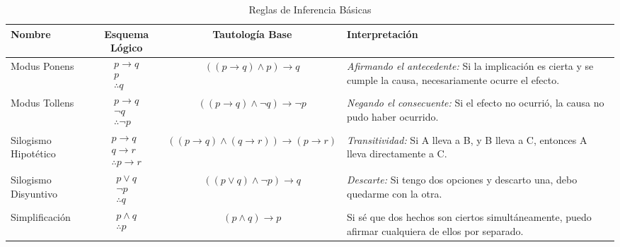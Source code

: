 \begin{table}[h]
\centering
\small
\renewcommand{\arraystretch}{1.5} %
\begin{tabularx}{\textwidth}{|l|c|c|X|}
\hline
\textbf{Nombre} & \textbf{Esquema Lógico} & \textbf{Tautología Base} & \textbf{Interpretación} \\ \hline
Modus Ponens & $\begin{array}{c} p \to q \\ p \\ \hline \therefore q \end{array}$ & $((p \to q) \land p) \to q$ & \textit{Afirmando el antecedente:} Si la implicación es cierta y se cumple la causa, necesariamente ocurre el efecto. \\ \hline
Modus Tollens & $\begin{array}{c} p \to q \\ \neg q \\ \hline \therefore \neg p \end{array}$ & $((p \to q) \land \neg q) \to \neg p$ & \textit{Negando el consecuente:} Si el efecto no ocurrió, la causa no pudo haber ocurrido. \\ \hline
Silogismo Hipotético & $\begin{array}{c} p \to q \\ q \to r \\ \hline \therefore p \to r \end{array}$ & $((p \to q) \land (q \to r)) \to (p \to r)$ & \textit{Transitividad:} Si A lleva a B, y B lleva a C, entonces A lleva directamente a C. \\ \hline
Silogismo Disyuntivo & $\begin{array}{c} p \lor q \\ \neg p \\ \hline \therefore q \end{array}$ & $((p \lor q) \land \neg p) \to q$ & \textit{Descarte:} Si tengo dos opciones y descarto una, debo quedarme con la otra. \\ \hline
Simplificación & $\begin{array}{c} p \land q \\ \hline \therefore p \end{array}$ & $(p \land q) \to p$ & Si sé que dos hechos son ciertos simultáneamente, puedo afirmar cualquiera de ellos por separado. \\ \hline
\end{tabularx}
\caption{Reglas de Inferencia Básicas}
\label{tab:reglas}
\end{table}


